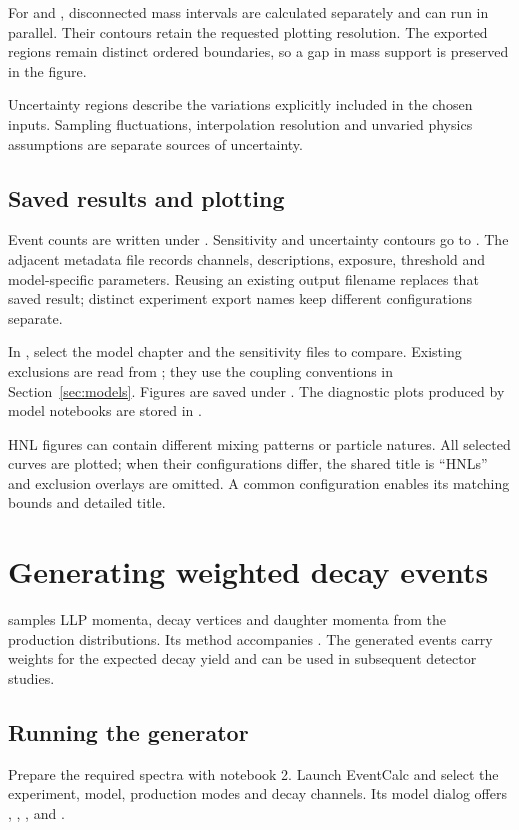 For  and , disconnected mass intervals are calculated separately and can run in parallel. Their contours retain the requested plotting resolution. The exported regions remain distinct ordered boundaries, so a gap in mass support is preserved in the figure.

Uncertainty regions describe the variations explicitly included in the chosen inputs. Sampling fluctuations, interpolation resolution and unvaried physics assumptions are separate sources of uncertainty.

\subsection{Saved results and plotting}
Event counts are written under . Sensitivity and uncertainty contours go to . The adjacent metadata file records channels, descriptions, exposure, threshold and model-specific parameters. Reusing an existing output filename replaces that saved result; distinct experiment export names keep different configurations separate.

In , select the model chapter and the sensitivity files to compare. Existing exclusions are read from ; they use the coupling conventions in Section~\ref{sec:models}. Figures are saved under . The diagnostic plots produced by model notebooks are stored in .

HNL figures can contain different mixing patterns or particle natures. All selected curves are plotted; when their configurations differ, the shared title is ``HNLs'' and exclusion overlays are omitted. A common configuration enables its matching bounds and detailed title.

\section{Generating weighted decay events}\label{sec:events}
 samples LLP momenta, decay vertices and daughter momenta from the production distributions. Its method accompanies . The generated events carry weights for the expected decay yield and can be used in subsequent detector studies.

\subsection{Running the generator}
Prepare the required spectra with notebook 2. Launch EventCalc and select the experiment, model, production modes and decay channels. Its model dialog offers , , ,  and .

